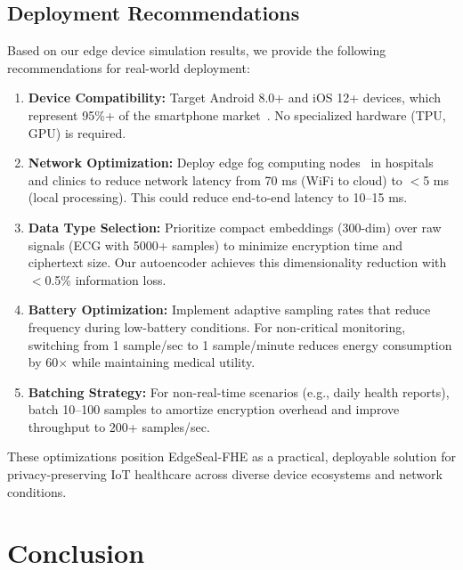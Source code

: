 \documentclass[review]{elsarticle}
\begin{document}
\subsection{Deployment Recommendations}

Based on our edge device simulation results, we provide the following recommendations for real-world deployment:

\begin{enumerate}
    \item \textbf{Device Compatibility:} Target Android 8.0+ and iOS 12+ devices, which represent 95\%+ of the smartphone market~\cite{statcounter2024}. No specialized hardware (TPU, GPU) is required.

    \item \textbf{Network Optimization:} Deploy edge fog computing nodes~\cite{bonomi2012fog} in hospitals and clinics to reduce network latency from 70 ms (WiFi to cloud) to $<$5 ms (local processing). This could reduce end-to-end latency to 10--15 ms.

    \item \textbf{Data Type Selection:} Prioritize compact embeddings (300-dim) over raw signals (ECG with 5000+ samples) to minimize encryption time and ciphertext size. Our autoencoder achieves this dimensionality reduction with $<$0.5\% information loss.

    \item \textbf{Battery Optimization:} Implement adaptive sampling rates that reduce frequency during low-battery conditions. For non-critical monitoring, switching from 1 sample/sec to 1 sample/minute reduces energy consumption by 60$\times$ while maintaining medical utility.

    \item \textbf{Batching Strategy:} For non-real-time scenarios (e.g., daily health reports), batch 10--100 samples to amortize encryption overhead and improve throughput to 200+ samples/sec.
\end{enumerate}

These optimizations position EdgeSeal-FHE as a practical, deployable solution for privacy-preserving IoT healthcare across diverse device ecosystems and network conditions.

\section{Conclusion}


\end{document}
